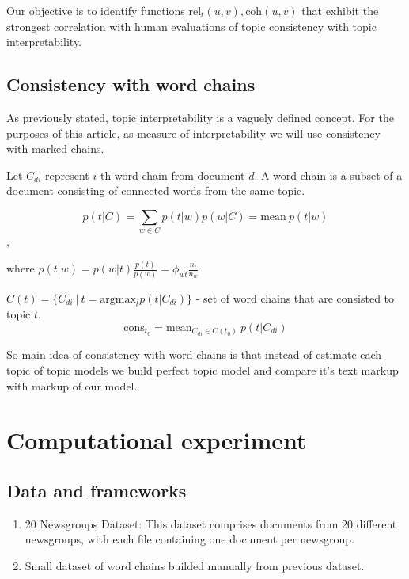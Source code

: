 \documentclass{article}
\begin{document}
Our objective is to identify functions $\text{rel}_t(u, v), \text{coh}(u, v)$  that exhibit the strongest correlation with human evaluations of topic consistency  with topic interpretability. 

\subsection{Consistency  with word chains}

As previously stated, topic interpretability is a vaguely defined concept. 
For the purposes of this article, as measure of interpretability we will use  consistency  with marked chains.

Let $C_{di}$ represent $i$-th word chain from document $d$. 
A word chain is a subset of a document consisting of connected words from the same topic.

\[
p(t \vert C) = \sum_{ w\in C} p(t |w) p(w |C) = \text{mean} \ p(t|w)
\],

where $p(t \vert w) = p(w \vert t) \frac {p(t)} {p(w)} = \phi_{wt} \frac {n_t} {n_w}$

$C(t) = \{C_{di} \ \vert \  t = \text{argmax}_{t} p (t \vert C_{di}) \}$ - set of word chains that are  consisted to topic $t$.
\[
\text{cons}_{t_0} = \text{mean}_{C_{di} \in C(t_0)} \ p(t \vert C_{di})
\]

So main idea of consistency  with word chains is that instead of estimate each topic of topic models we build  perfect topic model and compare it's text markup with markup of our model.

\section{Computational experiment}
\subsection{Data and frameworks}
\begin{enumerate}
    \item 20 Newsgroups Dataset: This dataset comprises documents from 20 different newsgroups, with each file containing one document per newsgroup.
    \item Small dataset of word chains builded manually from previous dataset.
\end{enumerate}


\end{document}
